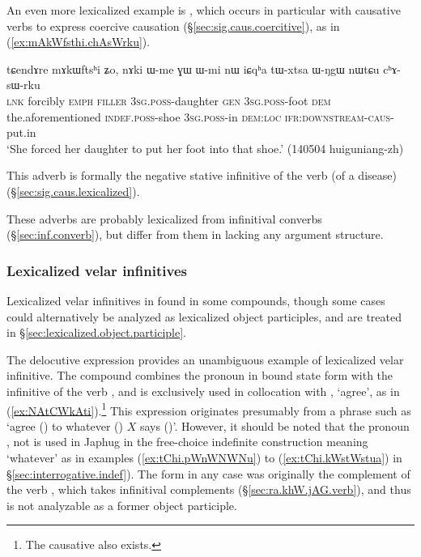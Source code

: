 An even more lexicalized example is , which occurs in particular with causative verbs to express coercive causation (§\ref{sec:sig.caus.coercitive}), as in (\ref{ex:mAkWfsthi.chAsWrku}).

\begin{exe}
\ex \label{ex:mAkWfsthi.chAsWrku}
 \gll  tɕendɤre mɤkɯftsʰi ʑo, nɤki ɯ-me ɣɯ ɯ-mi nɯ iɕqʰa tɯ-xtsa ɯ-ŋgɯ nɯtɕu cʰɤ-sɯ-rku  \\
 \textsc{lnk} forcibly \textsc{emph} \textsc{filler} \textsc{3sg}.\textsc{poss}-daughter \textsc{gen}  \textsc{3sg}.\textsc{poss}-foot \textsc{dem} the.aforementioned \textsc{indef}.\textsc{poss}-shoe \textsc{3sg}.\textsc{poss}-in \textsc{dem}:\textsc{loc} \textsc{ifr}:\textsc{downstream}-\textsc{caus}-put.in \\
\glt `She forced her daughter to put her foot into that shoe.' (140504 huiguniang-zh)
\end{exe}

This adverb is formally the negative stative infinitive of the verb  (of a disease) (§\ref{sec:sig.caus.lexicalized}).

These adverbs are probably lexicalized from infinitival converbs (§\ref{sec:inf.converb}), but differ from them in lacking any argument structure.
 
\subsubsection{Lexicalized velar infinitives}    \label{sec:lexicalized.velar.inf}
Lexicalized velar infinitives in  found in some compounds, though some cases could alternatively be analyzed as lexicalized object participles, and are treated in §\ref{sec:lexicalized.object.participle}.

The delocutive expression  provides an unambiguous example of lexicalized velar infinitive. The compound  combines the pronoun  in bound state form  with the  infinitive  of the verb , and is exclusively used in collocation with , `agree', as in (\ref{ex:NAtCWkAti}).\footnote{The causative  also exists.} 
This expression originates presumably from a phrase such as `agree () to whatever () $X$ says ()'. However, it should be noted that the pronoun , not  is used in Japhug in the free-choice indefinite construction meaning `whatever' as in examples (\ref{ex:tChi.pWnWNWNu}) to (\ref{ex:tChi.kWstWstua}) in §\ref{sec:interrogative.indef}). The form  in any case was originally the complement of the verb , which takes infinitival complements (§\ref{sec:ra.khW.jAG.verb}), and thus is not analyzable as a former object participle.

